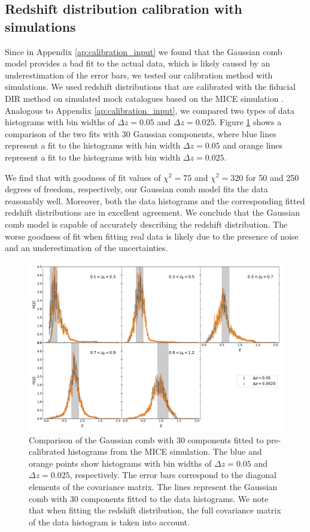 \documentclass{aa}
\begin{document}
\begin{appendix}
\subsection{Redshift distribution calibration with simulations}
\label{sec:MICE}
Since in Appendix \ref{ap:calibration_input} we found that the Gaussian comb model provides a bad fit to the actual data, which is likely caused by an underestimation of the error bars, we tested our calibration method with simulations. We used redshift distributions that are calibrated with the fiducial DIR method on simulated mock catalogues \citep{vdBusch20} based on the MICE simulation \citep{Mice1, Mice2, Mice3, carretero, hoffmann}. Analogous to Appendix \ref{ap:calibration_input}, we compared two types of data histograms with bin widths of $\Delta z = 0.05$ and $\Delta z = 0.025$. Figure \ref{fig:MICE} shows a comparison of the two fits with 30 Gaussian components, where blue lines represent a fit to the histograms with bin width $\Delta z = 0.05$ and orange lines represent a fit to the histograms with bin width $\Delta z = 0.025$. 

We find that with goodness of fit values of $\chi^2 = 75$ and $\chi^2 = 320$ for 50 and 250 degrees of freedom, respectively, our Gaussian comb model fits the data reasonably well. Moreover, both the data histograms and the corresponding fitted redshift distributions are in excellent agreement. We conclude that the Gaussian comb model is capable of accurately describing the redshift distribution. The worse goodness of fit when fitting real data is likely due to the presence of noise and an underestimation of the uncertainties. 
\begin{figure}
\centering
\includegraphics[width=\linewidth]{calibration_MICE.pdf}
\caption{Comparison of the Gaussian comb with 30 components fitted to pre-calibrated histograms from the MICE simulation. The blue and orange points show histograms with bin widths of $\Delta z = 0.05$ and $\Delta z = 0.025$, respectively. The error bars correspond to the diagonal elements of the covariance matrix. The lines represent the Gaussian comb with 30 components fitted to the data histograms. We note that when fitting the redshift distribution, the full covariance matrix of the data histogram is taken into account.}
\label{fig:MICE}
\end{figure}

\end{appendix}
\end{document}
